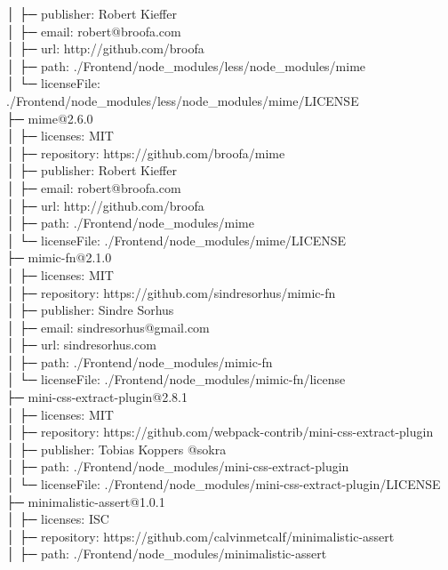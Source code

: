 │  ├─ publisher: Robert Kieffer\\
│  ├─ email: robert@broofa.com\\
│  ├─ url: http://github.com/broofa\\
│  ├─ path: ./Frontend/node\_modules/less/node\_modules/mime\\
│  └─ licenseFile: ./Frontend/node\_modules/less/node\_modules/mime/LICENSE\\
├─ mime@2.6.0\\
│  ├─ licenses: MIT\\
│  ├─ repository: https://github.com/broofa/mime\\
│  ├─ publisher: Robert Kieffer\\
│  ├─ email: robert@broofa.com\\
│  ├─ url: http://github.com/broofa\\
│  ├─ path: ./Frontend/node\_modules/mime\\
│  └─ licenseFile: ./Frontend/node\_modules/mime/LICENSE\\
├─ mimic-fn@2.1.0\\
│  ├─ licenses: MIT\\
│  ├─ repository: https://github.com/sindresorhus/mimic-fn\\
│  ├─ publisher: Sindre Sorhus\\
│  ├─ email: sindresorhus@gmail.com\\
│  ├─ url: sindresorhus.com\\
│  ├─ path: ./Frontend/node\_modules/mimic-fn\\
│  └─ licenseFile: ./Frontend/node\_modules/mimic-fn/license\\
├─ mini-css-extract-plugin@2.8.1\\
│  ├─ licenses: MIT\\
│  ├─ repository: https://github.com/webpack-contrib/mini-css-extract-plugin\\
│  ├─ publisher: Tobias Koppers @sokra\\
│  ├─ path: ./Frontend/node\_modules/mini-css-extract-plugin\\
│  └─ licenseFile: ./Frontend/node\_modules/mini-css-extract-plugin/LICENSE\\
├─ minimalistic-assert@1.0.1\\
│  ├─ licenses: ISC\\
│  ├─ repository: https://github.com/calvinmetcalf/minimalistic-assert\\
│  ├─ path: ./Frontend/node\_modules/minimalistic-assert\\
